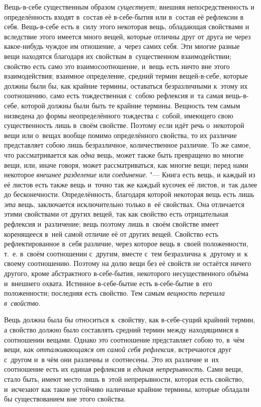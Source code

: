 Вещь-в-себе существенным образом
{\em существует;} внешняя непосредственность и
определённость входят в~состав её в-себе-бытия или в~состав её рефлексии в
себя. Вещь-в-себе есть в~силу этого некоторая вещь, обладающая свойствами и
вследствие этого имеется много вещей, которые отличны друг от друга не
через какое-нибудь чуждое им отношение, а~через самих себя. Эти многие
разные вещи находятся благодаря их свойствам в~существенном взаимодействии;
свойство есть само это взаимосоотношение, и~вещь есть ничто вне этого
взаимодействия; взаимное определение, средний термин вещей-в-себе, которые
должны были бы, как крайние термины, оставаться безразличными к~этому их
соотношению, само есть тождественная с~собою рефлексия и~та самая
вещь-в-себе, которой должны были быть те крайние термины. Вещность тем
самым низведена до формы неопределённого тождества с~собой, имеющего свою
существенность лишь в~своём свойстве. Поэтому если идёт речь о~некоторой
вещи или о~вещах вообще помимо определённого свойства, то их различие
представляет собою лишь безразличное, количественное различие. То же самое,
что рассматривается как {\em одна} вещь, может также
быть превращено во многие вещи, или, иначе говоря, может рассматриваться,
как многие вещи; перед нами некоторое {\em внешнее
разделение} или {\em соединение}. "--- Книга есть вещь, и
каждый из её листов есть также вещь и~точно так же каждый кусочек её
листов, и~так далее до бесконечности. Определённость, благодаря которой
некоторая вещь есть лишь {\em эта} вещь, заключается
исключительно только в~её свойствах. Она отличается этими свойствами от
других вещей, так как свойство есть отрицательная рефлексия и~различение;
вещь поэтому лишь в~своём свойстве имеет коренящееся в~ней самой отличие её
от других вещей. Свойство есть рефлектированное в~себя различие, через
которое вещь в~своей положенности, т.~е. в~своём соотношении с~другим,
вместе с~тем безразлична к~другому и~к своему соотношению. Поэтому на долю
вещи без её свойств не остаётся ничего другого, кроме абстрактного
в-себе-бытия, некоторого несущественного объёма и~внешнего охвата. Истинное
в-себе-бытие есть в-себе-бытие в~его положенности; последняя есть свойство.
Тем самым {\em вещность перешла в~свойство}.

Вещь должна была бы относиться к~свойству, как в-себе-сущий крайний термин,
а свойство должно было составлять средний термин между находящимися в
соотношении вещами. Однако это соотношение представляет собою то, в~чём
вещи, {\em как отталкивающаяся от самой себя
рефлексия,} встречаются друг с~другом и~в чём они различны и~соотнесены.
Это их различие и~их соотношение есть их единая рефлексия и
{\em единая непрерывность}. Сами вещи, стало быть,
имеют место лишь в~этой непрерывности, которая есть свойство, и~исчезают
как такие устойчиво наличные крайние термины, которые обладали бы
существованием вне этого свойства.

